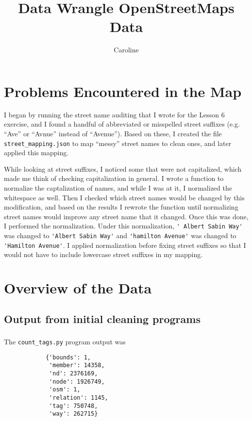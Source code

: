 \documentclass{article}
\author{Caroline}
\title{Data Wrangle OpenStreetMaps Data}
\begin{document}
    \maketitle
    \section{Problems Encountered in the Map}
        I began by running the street name auditing that I wrote for the Lesson
        6 exercise, and I found a handful of abbreviated or misspelled street
        suffixes (e.g. ``Ave'' or ``Avnue'' instead of ``Avenue''). Based on
        these, I created the file \texttt{street\_mapping.json} to map ``messy''
        street names to clean ones, and later applied this mapping.

        While looking at street suffixes, I noticed some that were not
        capitalized, which made me think of checking capitalization in general.
        I wrote a function to normalize the captalization of names, and while I
        was at it, I normalized the whitespace as well. Then I checked which
        street names would be changed by this modification, and based on the
        results I rewrote the function until normalizing street names would
        improve any street name that it changed. Once this was done, I performed
        the normalization. Under this normalization, \verb"' Albert Sabin Way'"
        was changed to \verb"'Albert Sabin Way'" and \verb"'hamilton Avenue'"
        was changed to \verb"'Hamilton Avenue'". I applied normalization before
        fixing street suffixes so that I would not have to include lowercase
        street suffixes in my mapping.

    \section{Overview of the Data}
        \subsection{Output from initial cleaning programs}
            \subsubsection{}
            The \texttt{count\_tags.py} program output was
            \begin{lstlisting}
            {'bounds': 1,
             'member': 14358,
             'nd': 2376169,
             'node': 1926749,
             'osm': 1,
             'relation': 1145,
             'tag': 750748,
             'way': 262715}
            \end{lstlisting}
\end{document}
